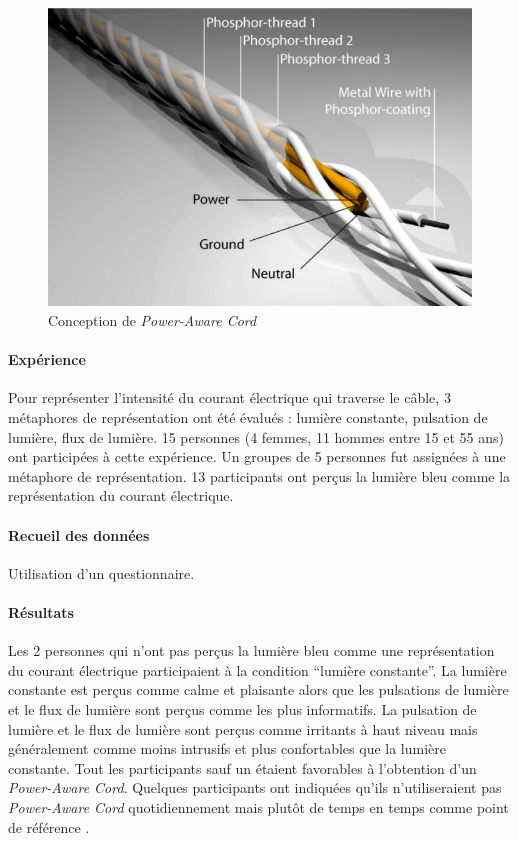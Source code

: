 \documentclass[10pt,a5paper,twoside]{article}
\begin{document}
\begin{figure}
\centering
\includegraphics[]{images/powerawarecord-screenshot2.png}
\caption{Conception de \emph{Power-Aware
Cord}}\label{fig:powerawarecord2}
\end{figure}

\paragraph{Expérience}\label{expuxe9rience-1}

Pour représenter l'intensité du courant électrique qui traverse le
câble, 3 métaphores de représentation ont été évalués : lumière
constante, pulsation de lumière, flux de lumière. 15 personnes (4
femmes, 11 hommes entre 15 et 55 ans) ont participées à cette
expérience. Un groupes de 5 personnes fut assignées à une métaphore de
représentation. 13 participants ont perçus la lumière bleu comme la
représentation du courant électrique.

\paragraph{Recueil des données}\label{recueil-des-donnuxe9es-6}

Utilisation d'un questionnaire.

\paragraph{Résultats}\label{ruxe9sultats-1}

Les 2 personnes qui n'ont pas perçus la lumière bleu comme une
représentation du courant électrique participaient à la condition
``lumière constante''. La lumière constante est perçus comme calme et
plaisante alors que les pulsations de lumière et le flux de lumière sont
perçus comme les plus informatifs. La pulsation de lumière et le flux de
lumière sont perçus comme irritants à haut niveau mais généralement
comme moins intrusifs et plus confortables que la lumière constante.
Tout les participants sauf un étaient favorables à l'obtention d'un
\emph{Power-Aware Cord}. Quelques participants ont indiquées qu'ils
n'utiliseraient pas \emph{Power-Aware Cord} quotidiennement mais plutôt
de temps en temps comme point de référence .
\end{document}

